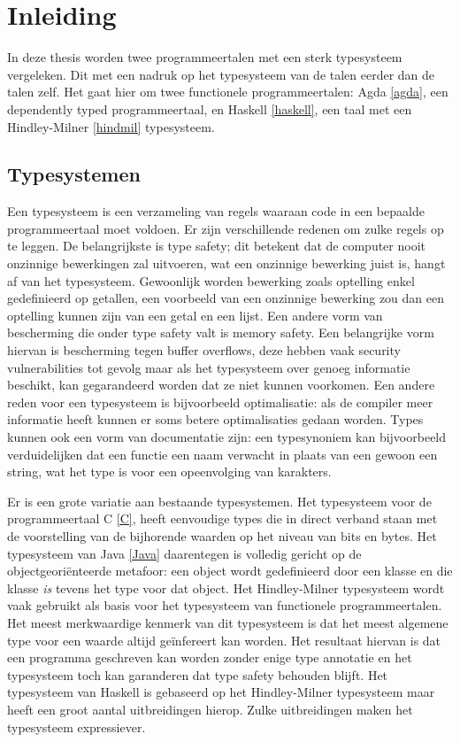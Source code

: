 \chapter{Inleiding}
\label{inleiding}

In deze thesis worden twee programmeertalen met een sterk typesysteem
vergeleken. Dit met een nadruk op het typesysteem van de talen eerder dan de
talen zelf. Het gaat hier om twee functionele programmeertalen: Agda
\ref{agda}, een dependently typed programmeertaal, en Haskell \ref{haskell},
een taal met een Hindley-Milner \ref{hindmil} typesysteem.


\section{Typesystemen}

Een typesysteem is een verzameling van regels waaraan code in een bepaalde
programmeertaal moet voldoen. Er zijn verschillende redenen om zulke regels op
te leggen. De belangrijkste is type safety; dit betekent dat de computer nooit
onzinnige bewerkingen zal uitvoeren, wat een onzinnige bewerking juist is,
hangt af van het typesysteem. Gewoonlijk worden bewerking zoals optelling enkel
gedefinieerd op getallen, een voorbeeld van een onzinnige bewerking zou dan een
optelling kunnen zijn van een getal en een lijst. Een andere vorm van
bescherming die onder type safety valt is memory safety. Een belangrijke vorm
hiervan is bescherming tegen buffer overflows, deze hebben vaak security
vulnerabilities tot gevolg maar als het typesysteem over genoeg informatie
beschikt, kan gegarandeerd worden dat ze niet kunnen voorkomen.  Een andere
reden voor een typesysteem is bijvoorbeeld optimalisatie: als de compiler meer
informatie heeft kunnen er soms betere optimalisaties gedaan worden. Types
kunnen ook een vorm van documentatie zijn: een typesynoniem kan bijvoorbeeld
verduidelijken dat een functie een naam verwacht in plaats van een gewoon een
string, wat het type is voor een opeenvolging van karakters.

Er is een grote variatie aan bestaande typesystemen. Het typesysteem voor de
programmeertaal C \ref{C}, heeft eenvoudige types die in direct verband staan
met de voorstelling van de bijhorende waarden op het niveau van bits en bytes.
Het typesysteem van Java \ref{Java} daarentegen is volledig gericht op de
objectgeoriënteerde metafoor: een object wordt gedefinieerd door een klasse en
die klasse \emph{is} tevens het type voor dat object. Het Hindley-Milner
typesysteem wordt vaak gebruikt als basis voor het typesysteem van functionele
programmeertalen. Het meest merkwaardige kenmerk van dit typesysteem is dat het
meest algemene type voor een waarde altijd geïnfereert kan worden. Het
resultaat hiervan is dat een programma geschreven kan worden zonder enige type
annotatie en het typesysteem toch kan garanderen dat type safety behouden
blijft. Het typesysteem van Haskell is gebaseerd op het Hindley-Milner
typesysteem maar heeft een groot aantal uitbreidingen hierop. Zulke
uitbreidingen maken het typesysteem expressiever.


